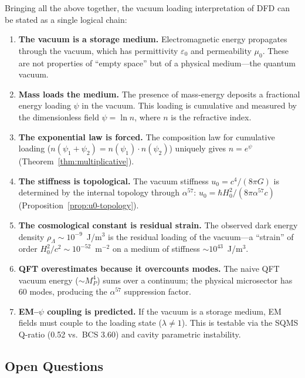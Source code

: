 \documentclass[11pt]{article}
\theoremstyle{plain}
\theoremstyle{definition}
\theoremstyle{remark}
\begin{document}
Bringing all the above together, the vacuum loading interpretation of
DFD can be stated as a single logical chain:

\begin{enumerate}
\item \textbf{The vacuum is a storage medium.}
Electromagnetic energy propagates through the vacuum, which has
permittivity $\varepsilon_0$ and permeability $\mu_0$. These are not
properties of ``empty space'' but of a physical medium---the quantum
vacuum.

\item \textbf{Mass loads the medium.}
The presence of mass-energy deposits a fractional energy loading
$\psi$ in the vacuum. This loading is cumulative and measured by the
dimensionless field $\psi = \ln n$, where $n$ is the refractive index.

\item \textbf{The exponential law is forced.}
The composition law for cumulative loading
($n(\psi_1 + \psi_2) = n(\psi_1) \cdot n(\psi_2)$) uniquely gives
$n = e^\psi$ (Theorem~\ref{thm:multiplicative}).

\item \textbf{The stiffness is topological.}
The vacuum stiffness $u_0 = c^4/(8\pi G)$ is determined by the
internal topology through $\alpha^{57}$:
$u_0 = \hbar H_0^2/(8\pi\alpha^{57}c)$
(Proposition~\ref{prop:u0-topology}).

\item \textbf{The cosmological constant is residual strain.}
The observed dark energy density $\rho_\Lambda \sim 10^{-9}$~J/m$^3$
is the residual loading of the vacuum---a ``strain'' of order
$H_0^2/c^2 \sim 10^{-52}$~m$^{-2}$ on a medium of stiffness
$\sim 10^{43}$~J/m$^3$.

\item \textbf{QFT overestimates because it overcounts modes.}
The naive QFT vacuum energy ($\sim M_P^4$) sums over a continuum;
the physical microsector has 60 modes, producing the $\alpha^{57}$
suppression factor.

\item \textbf{EM--$\psi$ coupling is predicted.}
If the vacuum is a storage medium, EM fields must couple to the
loading state ($\lambda \neq 1$). This is testable via the SQMS
Q-ratio (0.52 vs.\ BCS 3.60) and cavity parametric instability.
\end{enumerate}

\subsection{Open Questions}
\end{document}
